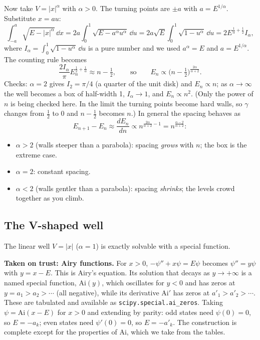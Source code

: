 Now take $V=|x|^\alpha$ with $\alpha>0$. The turning points are $\pm a$ with $a=E^{1/\alpha}$. Substitute $x=au$:
\[
\int_{-a}^{a}\sqrt{E-|x|^\alpha}\,\dd x=2a\int_0^1\sqrt{E-a^\alpha u^\alpha}\,\dd u=2a\sqrt E\int_0^1\sqrt{1-u^\alpha}\,\dd u=2E^{\frac1\alpha+\frac12}I_\alpha ,
\]
where $I_\alpha=\int_0^1\sqrt{1-u^\alpha}\,\dd u$ is a pure number and we used $a^\alpha=E$ and $a=E^{1/\alpha}$. The counting rule becomes
\begin{equation}
\frac{2I_\alpha}{\pi}E_n^{\frac12+\frac1\alpha}\approx n-\tfrac12,
\qquad\text{so}\qquad
E_n\propto\bigl(n-\tfrac12\bigr)^{\frac{2\alpha}{\alpha+2}}.
\label{eq:bound-states-powerlaw}
\end{equation}
Checks: $\alpha=2$ gives $I_2=\pi/4$ (a quarter of the unit disk) and $E_n\propto n$; as $\alpha\to\infty$ the well becomes a box of half-width 1, $I_\alpha\to1$, and $E_n\propto n^2$. (Only the power of $n$ is being checked here. In the limit the turning points become hard walls, so $\gamma$ changes from $\tfrac12$ to 0 and $n-\tfrac12$ becomes $n$.) In general the spacing behaves as
\[
E_{n+1}-E_n\approx\frac{dE_n}{dn}\propto n^{\frac{2\alpha}{\alpha+2}-1}=n^{\frac{\alpha-2}{\alpha+2}}:
\]
\begin{itemize}
\item $\alpha>2$ (walls steeper than a parabola): spacing \emph{grows} with $n$; the box is the extreme case.
\item $\alpha=2$: constant spacing.
\item $\alpha<2$ (walls gentler than a parabola): spacing \emph{shrinks}; the levels crowd together as you climb.
\end{itemize}

\subsection{The V-shaped well}

The linear well $V=|x|$ ($\alpha=1$) is exactly solvable with a special function.

\begin{beyond}
\textbf{Taken on trust: Airy functions.} For $x>0$, $-\psi''+x\psi=E\psi$ becomes $\psi''=y\psi$ with $y=x-E$. This is Airy's equation. Its solution that decays as $y\to+\infty$ is a named special function, $\mathrm{Ai}(y)$, which oscillates for $y<0$ and has zeros at $y=a_1>a_2>\cdots$ (all negative), while its derivative $\mathrm{Ai}'$ has zeros at $a'_1>a'_2>\cdots$. These are tabulated and available as \texttt{scipy.special.ai\_zeros}. Taking $\psi=\mathrm{Ai}(x-E)$ for $x>0$ and extending by parity: odd states need $\psi(0)=0$, so $E=-a_k$; even states need $\psi'(0)=0$, so $E=-a'_k$. The construction is complete except for the properties of $\mathrm{Ai}$, which we take from the tables.
\end{beyond}

